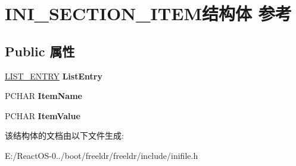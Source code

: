 \hypertarget{struct_i_n_i___s_e_c_t_i_o_n___i_t_e_m}{}\section{I\+N\+I\+\_\+\+S\+E\+C\+T\+I\+O\+N\+\_\+\+I\+T\+E\+M结构体 参考}
\label{struct_i_n_i___s_e_c_t_i_o_n___i_t_e_m}
\subsection*{Public 属性}
\begin{DoxyCompactItemize}
\item 
\mbox{\label{struct_i_n_i___s_e_c_t_i_o_n___i_t_e_m_a0e97ff38d03b997b829baa7c2f4853c9}} 
\hyperlink{struct___l_i_s_t___e_n_t_r_y}{L\+I\+S\+T\+\_\+\+E\+N\+T\+RY} {\bfseries List\+Entry}
\item 
\mbox{\label{struct_i_n_i___s_e_c_t_i_o_n___i_t_e_m_a15f1c2badd9045e6bb4319c85532d250}} 
P\+C\+H\+AR {\bfseries Item\+Name}
\item 
\mbox{\label{struct_i_n_i___s_e_c_t_i_o_n___i_t_e_m_a1741a56480f46fb264dd055abd59d3e7}} 
P\+C\+H\+AR {\bfseries Item\+Value}
\end{DoxyCompactItemize}


该结构体的文档由以下文件生成\+:\begin{DoxyCompactItemize}
\item 
E\+:/\+React\+O\+S-\/0../boot/freeldr/freeldr/include/inifile.\+h\end{DoxyCompactItemize}
